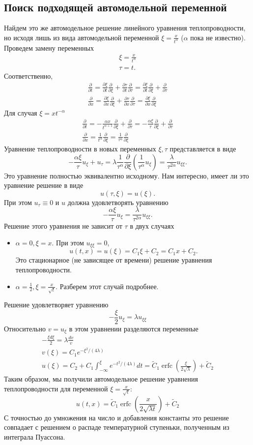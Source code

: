 \documentclass[12pt]{article}
\newcommand{\pd}[2]{\frac{\partial #1}{\partial #2}}
\begin{document}
\subsection{Поиск подходящей автомодельной переменной}
Найдем это же автомодельное решение линейного уравнения теплопроводности, но исходя лишь из вида автомодельной переменной $\xi = \frac{x}{t^\alpha}$ ($\alpha$ пока не известно). Проведем замену переменных
\begin{gather*}
\xi = \frac{x}{t^\alpha}\\
\tau = t.
\end{gather*}
Соответственно,
\begin{gather*}
\pd{}{t} = \pd{\xi}{t}\pd{}{\xi} + \pd{\tau}{t}\pd{}{\tau} = \pd{\xi}{t}\pd{}{\xi} + \pd{}{\tau}\\
\pd{}{x} = \pd{\xi}{x}\pd{}{\xi} + \pd{\tau}{x}\pd{}{\tau} = \pd{\xi}{x}\pd{}{\xi}
\end{gather*}
Для случая $\xi = xt^{-\alpha}$
\begin{gather*}
\pd{}{t} = -\frac{\alpha x}{t^{\alpha+1}}\pd{}{\xi} + \pd{}{\tau} = 
-\frac{\alpha \xi}{\tau} \pd{}{\xi} + \pd{}{\tau}
\\
\pd{}{x} = \frac{1}{t^\alpha}\pd{}{\xi} = \frac{1}{\tau^\alpha} \pd{}{\xi}
\end{gather*}
Уравнение теплопроводности в новых переменных $\xi, \tau$ представляется в виде
\[
-\frac{\alpha \xi}{\tau} u_\xi + u_\tau = \lambda \frac{1}{\tau^\alpha} \pd{}{\xi}\left(
\frac{1}{\tau^\alpha} u_\xi
\right) = 
\frac{\lambda}{\tau^{2\alpha}} u_{\xi\xi}.
\]
Это уравнение полностью эквивалентно исходному. Нам интересно, имеет ли это уравнение решение в виде
\[
u(\tau, \xi) = u(\xi).
\]
При этом $u_\tau \equiv 0$ и $u$ должна удовлетворять уравнению
\[
-\frac{\alpha \xi}{\tau} u_\xi = 
\frac{\lambda}{\tau^{2\alpha}} u_{\xi\xi}.
\]
Решение этого уравнения не зависит от $\tau$ в двух случаях
\begin{itemize}
\item $\alpha = 0, \xi = x$. При этом $u_{\xi\xi} = 0$, 
\[u(t, x) = u(\xi) = C_1\xi+C_2 = C_1 x + C_2.\]
Это стационарное (не зависящее от времени) решение уравнения теплопроводности.
\item $\alpha = \frac{1}{2}, \xi = \frac{x}{\sqrt{t}}$. Разберем этот случай подробнее.
\end{itemize}
Решение удовлетворяет уравнению
\[
-\frac{\xi}{2} u_\xi = \lambda u_{\xi\xi}
\]
Относительно $v = u_\xi$ в этом уравнении разделяются переменные
\begin{gather*}
-\frac{\xi d\xi}{2} = \lambda \frac{dv}{v}\\
v(\xi) = C_1 e^{-\xi^2/(4\lambda)}\\
u(\xi) = C_2 + C_1 \int_{-\infty}^{\xi} e^{-t^2/(4\lambda)} dt = 
\tilde{C}_1 \operatorname{erfc}\left(\frac{\xi}{2\sqrt{\lambda}}\right) + \tilde{C}_2
\end{gather*}
Таким образом, мы получили автомодельное решение уравнения теплопроводности для переменной $\xi = \frac{x}{\sqrt{t}}$:
\[
u(t, x) = \tilde{C}_1 \operatorname{erfc}\left(\frac{x}{2\sqrt{\lambda t}}\right) + \tilde{C}_2
\]
С точностью до умножения на число и добавления константы это решение совпадает с решением о распаде температурной ступеньки, полученным из интеграла Пуассона.
\end{document}
